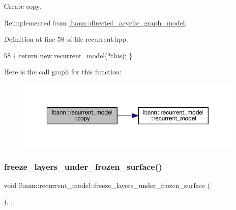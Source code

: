 Create copy. 

Reimplemented from \hyperlink{classlbann_1_1directed__acyclic__graph__model_a6a21050a732686e9e6c9f384ff9fda51}{lbann\+::directed\+\_\+acyclic\+\_\+graph\+\_\+model}.



Definition at line 58 of file recurrent.\+hpp.


\begin{DoxyCode}
58 \{ \textcolor{keywordflow}{return} \textcolor{keyword}{new} \hyperlink{classlbann_1_1recurrent__model_ac1d3118a1642bd460c9cc9617a592a0b}{recurrent\_model}(*\textcolor{keyword}{this}); \}
\end{DoxyCode}
Here is the call graph for this function\+:\nopagebreak
\begin{figure}[H]
\begin{center}
\leavevmode
\includegraphics[width=350pt]{classlbann_1_1recurrent__model_ad184f898241fe026f140db689f129d47_cgraph}
\end{center}
\end{figure}
\mbox{\label{classlbann_1_1recurrent__model_aa4e43de8bf0d11a0f51dedbcf22a73cc}} 
\subsubsection{\texorpdfstring{freeze\+\_\+layers\+\_\+under\+\_\+frozen\+\_\+surface()}{freeze\_layers\_under\_frozen\_surface()}}
{\footnotesize\ttfamily void lbann\+::recurrent\+\_\+model\+::freeze\+\_\+layers\+\_\+under\+\_\+frozen\+\_\+surface (\begin{DoxyParamCaption}{ }\end{DoxyParamCaption})\hspace{0.3cm}{\ttfamily [inline]}, {\ttfamily [override]}, {\ttfamily [virtual]}}

